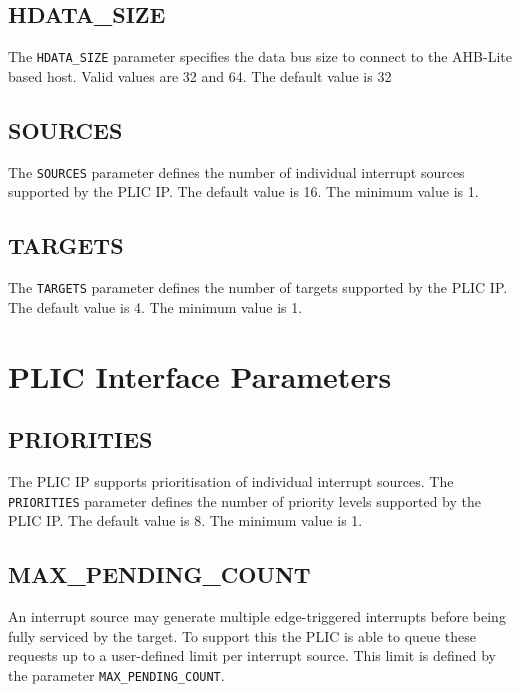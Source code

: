 \subsection{HDATA\_SIZE}

The \texttt{HDATA\_SIZE} parameter specifies the data bus size to connect to the AHB-Lite based host. Valid values are 32 and 64. The default value is 32

\hypertarget{SOURCES}{\subsection{SOURCES}\label{sec:SOURCES}}

The \texttt{SOURCES} parameter defines the number of individual
interrupt sources supported by the PLIC IP. The default value is 16. The
minimum value is 1.

\hypertarget{TARGETS}{\subsection{TARGETS}\label{sec:TARGETS}}

The \texttt{TARGETS} parameter defines the number of targets supported
by the PLIC IP. The default value is 4. The minimum value is 1.

\pagebreak

\section{PLIC Interface Parameters}

\subsection{PRIORITIES}

The PLIC IP supports prioritisation of individual interrupt sources. The \texttt{PRIORITIES} parameter defines the number of priority levels supported by the PLIC IP. The default value is 8. The minimum value is 1.

\subsection{MAX\_PENDING\_COUNT}

An interrupt source may generate multiple edge-triggered interrupts before being fully serviced by the target. To support this the PLIC is able to queue these requests up to a user-defined limit per interrupt source. This limit is defined by the parameter \texttt{MAX\_PENDING\_COUNT}.

